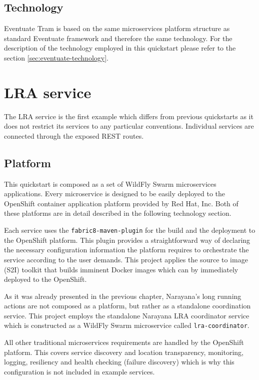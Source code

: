 \documentclass[oneside,
  digital, %
  table,   %
  nolof,     %
  nolot,     %
]{fithesis3}
\begin{document}
\subsection{Technology}

Eventuate Tram is based on the same microservices platform structure as standard Eventuate framework and therefore the same technology. For the description of the technology employed in this quickstart please refer to the section \ref{sec:eventuate-technology}.

\section{LRA service}

The LRA service is the first example which differs from previous quickstarts as it does not restrict its services to any particular conventions. Individual services are connected through the exposed REST routes.

\subsection{Platform}

This quickstart is composed as a set of WildFly Swarm microservices applications. Every microservice is designed to be easily deployed to the OpenShift container application platform provided by Red Hat, Inc. \cite{openshift} Both of these platforms are in detail described in the following technology section.

Each service uses the \texttt{fabric8-maven-plugin} for the build and the deployment to the OpenShift platform. This plugin provides a straightforward way of declaring the necessary configuration information the platform requires to orchestrate the service according to the user demands. This project applies the source to image (S2I) toolkit that builds imminent Docker images which can by immediately deployed to the OpenShift. 

As it was already presented in the previous chapter, Narayana's long running actions are not composed as a platform, but rather as a standalone coordination service. This project employs the standalone Narayana LRA coordinator service which is constructed as a WildFly Swarm microservice called \texttt{lra-coordinator}. 

All other traditional microservices requirements are handled by the OpenShift platform. This covers service discovery and location transparency, monitoring, logging, resiliency and health checking (failure discovery) which is why this configuration is not included in example services.
\end{document}
